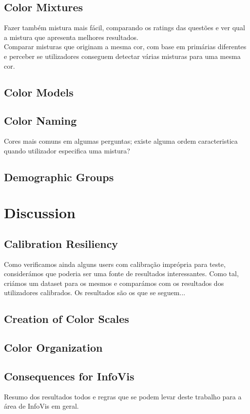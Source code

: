 \subsection{Color Mixtures}
\label{subsec:results_colormixtures}
%
Fazer também mistura mais fácil, comparando os ratings das questões e ver qual a mistura que apresenta melhores resultados. \\
Comparar misturas que originam a mesma cor, com base em primárias diferentes e perceber se utilizadores conseguem detectar várias
misturas para uma mesma cor.
%
\subsection{Color Models}
\label{subsec:results_colormodels}
%
\subsection{Color Naming}
\label{subsec:results_namingcolors}
%
Cores mais comuns em algumas perguntas; existe alguma ordem caracteristica quando utilizador especifica uma mistura?
%
\subsection{Demographic Groups}
\label{subsec:results_demographic}

\section{Discussion}
\label{sec:results_discussion}

\subsection{Calibration Resiliency}
\label{subsec:results_calibration}
%
Como verificamos ainda alguns users com calibração imprópria para teste, considerámos que poderia ser uma fonte de resultados
interessantes. Como tal, criámos um dataset para os mesmos e comparámos com os resultados dos utilizadores calibrados. Os resultados
são os que se seguem... \par
%
\subsection{Creation of Color Scales}
\label{subsec:results_discussion_colorscales}

\subsection{Color Organization}
\label{subsec:results_discussion_colororganization}

\subsection{Consequences for InfoVis}
\label{subsec:results_discussion_infovis}
%
Resumo dos resultados todos e regras que se podem levar deste trabalho para a área de InfoVis em geral.
%

